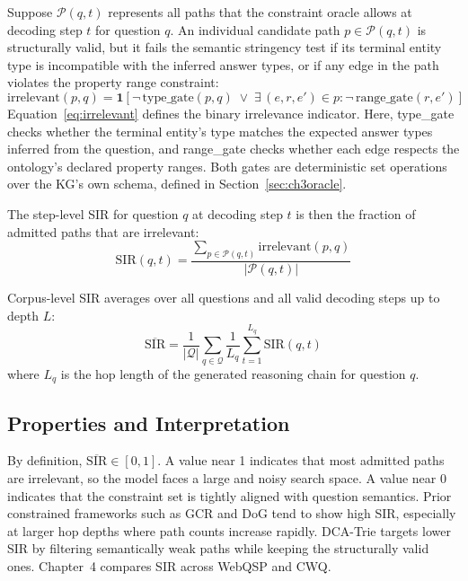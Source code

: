 Suppose $\mathcal{P}(q, t)$ represents all paths that the constraint oracle allows at decoding step $t$ for question $q$. An individual candidate path $p \in \mathcal{P}(q, t)$ is structurally valid, but it fails the semantic stringency test if its terminal entity type is incompatible with the inferred answer types, or if any edge in the path violates the property range constraint:
\begin{equation}
  \text{irrelevant}(p, q) = \mathbf{1}\!\left[
    \neg\,\text{type\_gate}(p, q) \;\lor\;
    \exists\, (e, r, e') \in p :
    \neg\,\text{range\_gate}(r, e')
    \right]
  \label{eq:irrelevant}
\end{equation}
Equation~\eqref{eq:irrelevant} defines the binary irrelevance indicator. Here, type\_gate checks whether the terminal entity's type matches the expected answer types inferred from the question, and range\_gate checks whether each edge respects the ontology's declared property ranges. Both gates are deterministic set operations over the KG's own schema, defined in Section~\ref{sec:ch3oracle}.

The step-level SIR for question $q$ at decoding step $t$ is then the fraction of admitted paths that are irrelevant:
\begin{equation}
  \text{SIR}(q, t) = \frac{\sum_{p \in \mathcal{P}(q,t)}
    \text{irrelevant}(p, q)}{|\mathcal{P}(q, t)|}
  \label{eq:sir_step}
\end{equation}

Corpus-level SIR averages over all questions and all valid decoding steps up to depth $L$:
\begin{equation}
  \overline{\text{SIR}} = \frac{1}{|\mathcal{Q}|} \sum_{q \in \mathcal{Q}}
  \frac{1}{L_q} \sum_{t=1}^{L_q} \text{SIR}(q, t)
  \label{eq:sir_aggregate}
\end{equation}
where $L_q$ is the hop length of the generated reasoning chain for question $q$.

\subsection{Properties and Interpretation}

By definition, $\overline{\text{SIR}} \in [0,1]$. A value near 1 indicates that most admitted paths are irrelevant, so the model faces a large and noisy search space. A value near 0 indicates that the constraint set is tightly aligned with question semantics. Prior constrained frameworks such as GCR and DoG tend to show high SIR, especially at larger hop depths where path counts increase rapidly. DCA-Trie targets lower SIR by filtering semantically weak paths while keeping the structurally valid ones. Chapter~4 compares SIR across WebQSP and CWQ.

